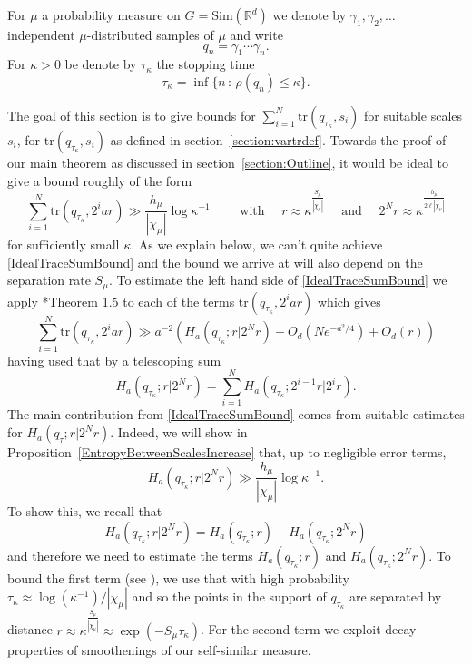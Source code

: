 \documentclass[10pt, english,oneside,reqno]{amsart}
\theoremstyle{plain}
\theoremstyle{remark}
\numberwithin{equation}{section}
\numberwithin{figure}{section}
\newcommand{\R}{\mathbb{R}}
\begin{document}
For $\mu$ a probability measure on $G = \mathrm{Sim}(\R^d)$ we denote by $\gamma_1, \gamma_2, \ldots$ independent $\mu$-distributed samples of $\mu$ and write $$q_n = \gamma_1\cdots \gamma_n.$$  For $\kappa > 0$ be denote by $\tau_{\kappa}$ the stopping time $$\tau_{\kappa} = \inf\{ n\,:\, \rho(q_n) \leq \kappa \}.$$

The goal of this section is to give bounds for $\sum_{i = 1}^N \mathrm{tr}(q_{\tau_{\kappa}}, s_i)$ for suitable scales $s_i$, for $\mathrm{tr}(q_{\tau_{\kappa}}, s_i)$ as defined in section~\ref{section:vartrdef}. Towards the proof of our main theorem as discussed in section~\ref{section:Outline}, it would be ideal to give a bound roughly of the form
\begin{equation}\label{IdealTraceSumBound}
    \sum_{i = 1}^{N} \mathrm{tr}(q_{\tau_{\kappa}}, 2^ia r) \gg \frac{h_{\mu}}{|\chi_{\mu}|} \log \kappa^{-1} \quad\quad \text{ with } \quad r  \approx \kappa^{\frac{S_{\mu}}{|\chi_{\mu}|}} \quad \text{ and } \quad 2^Nr \approx \kappa^{\frac{h_{\mu}}{2\ell|\chi_{\mu}|}}
\end{equation} for sufficiently small $\kappa$. As we explain below, we can't quite achieve \eqref{IdealTraceSumBound} and the bound we arrive at will also depend on the separation rate $S_{\mu}$. To estimate the left hand side of \eqref{IdealTraceSumBound} we apply \cite{KittleKoglerEntropy}*{Theorem 1.5} to each of the terms $\mathrm{tr}(q_{\tau_{\kappa}}, 2^ia r)$ which gives
\begin{equation}\label{SketchTraceSum}
    \sum_{i = 1}^{N} \mathrm{tr}(q_{\tau_{\kappa}}, 2^ia r) \gg a^{-2}(H_a(q_{\tau_{\kappa}}; r|2^Nr) + O_{d}(Ne^{-a^2/4}) + O_{d}(r) )
\end{equation}
having used that by a telescoping sum $$H_a(q_{\tau_{\kappa}}; r|2^Nr) = \sum_{i = 1}^N H_a(q_{\tau_{\kappa}}; 2^{i - 1}r|2^i r).$$ The main contribution from \eqref{IdealTraceSumBound} comes from suitable estimates for $H_a(q_{\tau}; r|2^Nr)$. Indeed, we will show in Proposition~\ref{EntropyBetweenScalesIncrease} that, up to negligible error terms, 
\begin{equation}\label{ApproxEntropyBetweenScales}
    H_a(q_{\tau_{\kappa}}; r|2^Nr)  \gg \frac{h_{\mu}}{|\chi_{\mu}|} \log \kappa^{-1}.
\end{equation}
To show this, we recall that $$H_a(q_{\tau_{\kappa}}; r|2^Nr) = H_a(q_{\tau_{\kappa}}; r) - H_a(q_{\tau_{\kappa}}; 2^N r)$$ and therefore we need to estimate the terms $H_a(q_{\tau_{\kappa}}; r)$ and $H_a(q_{\tau_{\kappa}}; 2^N r)$. To bound the first term (see \cite{KittleKoglerEntropy}), we use that with high probability $\tau_{\kappa} \approx  \log(\kappa^{-1})/|\chi_{\mu}|$ and so the points in the support of $q_{\tau_{\kappa}}$ are separated by distance $r \approx \kappa^{\frac{S_{\mu}}{|\chi_{\mu}|}} \approx \exp(-S_{\mu}\tau_{\kappa})$. For the second term we exploit decay properties of smoothenings of our self-similar measure. 
\end{document}
